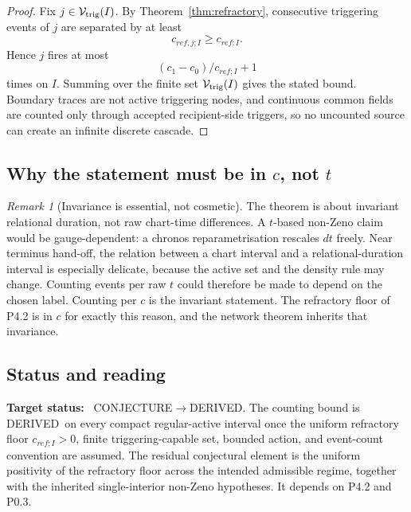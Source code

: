 \documentclass[11pt,a4paper]{article}
\def\mathfrak#1{#1}%
\def\mathrm#1{#1}%
\newcommand{\stDerived}{\textcolor{cDer}{\textsf{\small DERIVED}}}
\newcommand{\stConj}{\textcolor{cCon}{\textsf{\small CONJECTURE}}}
\theoremstyle{definition}
\theoremstyle{plain}
\theoremstyle{remark}
\newtheorem{remark}[definition]{Remark}
\begin{document}
\begin{proof}
Fix \(j\in\mathcal V_{\rm trig}(I)\). By
Theorem~\ref{thm:refractory}, consecutive triggering events of \(j\) are separated
by at least
\[
\mathfrak c_{\mathrm{ref},j;I}\ge\mathfrak c_{\mathrm{ref};I}.
\]
Hence \(j\) fires at most
\[
(\mathfrak c_1-\mathfrak c_0)/\mathfrak c_{\mathrm{ref};I}+1
\]
times on \(I\). Summing over the finite set
\(\mathcal V_{\rm trig}(I)\) gives the stated bound. Boundary traces are not active
triggering nodes, and continuous common fields are counted only through accepted
recipient-side triggers, so no uncounted source can create an infinite discrete
cascade. \qedhere
\end{proof}

\subsection{Why the statement must be in \texorpdfstring{\(\mathfrak c\)}{c}, not \texorpdfstring{\(t\)}{t}}

\begin{remark}[Invariance is essential, not cosmetic]\label{rem:invariance}
The theorem is about invariant relational duration, not raw chart-time
differences. A \(t\)-based non-Zeno claim would be gauge-dependent: a chronos
reparametrisation rescales \(dt\) freely. Near terminus hand-off, the relation
between a chart interval and a relational-duration interval is especially delicate,
because the active set and the density rule may change. Counting events per raw
\(t\) could therefore be made to depend on the chosen label. Counting per
\(\mathfrak c\) is the invariant statement. The refractory floor of P4.2 is in
\(\mathfrak c\) for exactly this reason, and the network theorem inherits that
invariance.
\end{remark}

\subsection{Status and reading}

\textbf{Target status:}~
\stConj\(\to\)\stDerived. The counting bound is \stDerived\ on every compact
regular-active interval once the uniform refractory floor
\(\mathfrak c_{\mathrm{ref};I}>0\), finite triggering-capable set, bounded action,
and event-count convention are assumed. The residual conjectural element is the
uniform positivity of the refractory floor across the intended admissible regime,
together with the inherited single-interior non-Zeno hypotheses. It depends on
P4.2 and P0.3.
\end{document}
